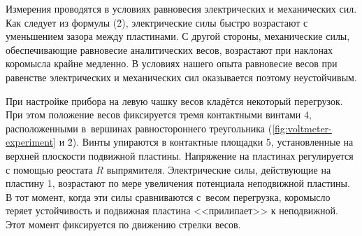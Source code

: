 Измерения проводятся в условиях равновесия электрических и механических сил. Как следует из формулы (\r{2}),
электрические силы быстро возрастают с уменьшением зазора между пластинами. С другой стороны, механические силы,
обеспечивающие равновесие аналитических весов, возрастают при наклонах коромысла крайне медленно. В условиях нашего
опыта равновесие весов при равенстве электрических и механических сил оказывается поэтому неустойчивым.

При настройке прибора на левую чашку весов кладётся некоторый перегрузок. При этом положение весов фиксируется тремя
контактными винтами 4, расположенными в~вершинах равностороннего треугольника (\ref{fig:voltmeter-experiment} и \r{2}). Винты упираются в
контактные площадки 5, установленные на верхней плоскости подвижной пластины. Напряжение на пластинах регулируется с
помощью реостата $R$ выпрямителя. Электрические силы, действующие на пластину 1, возрастают по мере увеличения
потенциала неподвижной пластины. В тот момент, когда эти силы сравниваются с~весом перегрузка, коромысло теряет
устойчивость и подвижная пластина <<прилипает>> к неподвижной. Этот момент фиксируется по движению стрелки весов.

